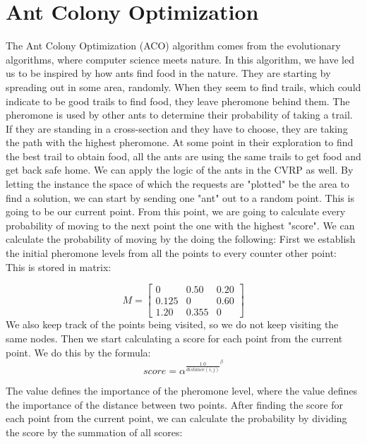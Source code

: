 \documentclass[12pt]{article}
\begin{document}
\newpage
\section{Ant Colony Optimization}
The Ant Colony Optimization (ACO) algorithm comes from the evolutionary algorithms, where computer science meets nature. In this algorithm, 
we have led us to be inspired by how ants find food in the nature. They are starting by spreading out in some area, randomly. When they seem to find trails, 
which could indicate to be good trails to find food, they leave pheromone behind them. The pheromone is used by other ants to determine their probability of taking 
a trail. If they are standing in a cross-section and they have to choose, they are taking the path with the highest pheromone. 
At some point in their exploration to find the best trail to obtain food, all the ants are using the same trails to get food and get back safe home. 
\newline
We can apply the logic of the ants in the CVRP as well. By letting the instance \- the space of which the requests are "plotted" \- be the area to find a solution, 
we can start by sending one "ant" out to a random point. This is going to be our current point. From this point, we are going to calculate every probability of moving to the next point \- the one with the highest "score". 
We can calculate the probability of moving by the doing the following: 
\newline
First we establish the initial pheromone levels from all the points to every counter other point: \\
This is stored in matrix: 

\[
M = \begin{bmatrix}
    0 & 0.50 & 0.20           \\[0.3em]
    0.125 & 0           & 0.60 \\[0.3em]
    1.20 & 0.355 & 0
\end{bmatrix}
\]
We also keep track of the points being visited, so we do not keep visiting the same nodes. Then we start calculating a score for each point from the current point.
We do this by the formula: \\


\begin{equation}
score = \alpha^{\frac{1.0}{distance(i,j)}^\beta}
\end{equation}

The \textalpha  value defines the importance of the pheromone level, where the \textbeta  value defines the importance of the distance between two points. After finding the score for 
each point from the current point, we can calculate the probability by dividing the score by the summation of all scores: \\
\end{document}
